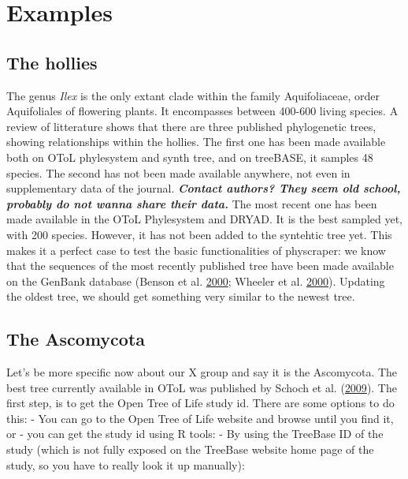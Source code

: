 \documentclass[]{article}
\begin{document}
\hypertarget{examples}{%
\section{Examples}\label{examples}}

\hypertarget{the-hollies}{%
\subsection{The hollies}\label{the-hollies}}

The genus \emph{Ilex} is the only extant clade within the family Aquifoliaceae, order Aquifoliales of flowering plants.
It encompasses between 400-600 living species. A review of litterature shows that there are three published phylogenetic trees, showing relationships within the hollies.
The first one has been made available both on OToL phylesystem and synth tree, and on treeBASE, it samples 48 species.
The second has not been made available anywhere, not even in supplementary data of the journal.
\textbf{\emph{Contact authors? They seem old school, probably do not wanna share their data.}}
The most recent one has been made available in the OToL Phylesystem and DRYAD. It is the best sampled yet, with 200 species. However,
it has not been added to the syntehtic tree yet.
This makes it a perfect case to test the basic functionalities of physcraper: we know that the sequences of the most recently published tree have been made available on the GenBank database (Benson et al. \protect\hyperlink{ref-benson2000genbank}{2000}; Wheeler et al. \protect\hyperlink{ref-wheeler2000database}{2000}). Updating the oldest tree, we should get something very similar to the newest tree.

\hypertarget{the-ascomycota}{%
\subsection{The Ascomycota}\label{the-ascomycota}}

Let's be more specific now about our X group and say it is the Ascomycota.
The best tree currently available in OToL was published by Schoch et al. (\protect\hyperlink{ref-schoch2009ascomycota}{2009}).
The first step, is to get the Open Tree of Life study id. There are some options to do this:
- You can go to the Open Tree of Life website and browse until you find it, or
- you can get the study id using R tools:
- By using the TreeBase ID of the study (which is not fully exposed on the
TreeBase website home page of the study, so you have to really look it up manually):
\end{document}

